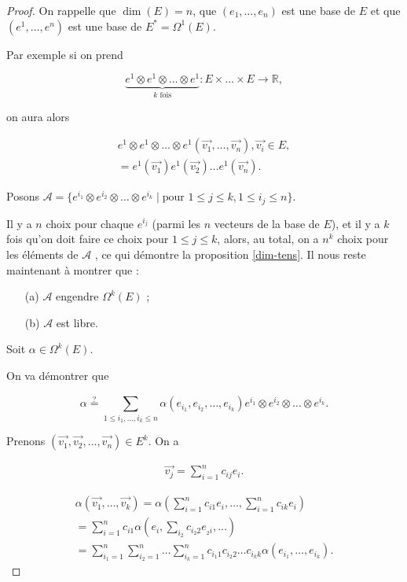 \documentclass[french]{article}
\theoremstyle{definition}
\begin{document}
\begin{proof}
  On rappelle que $\operatorname{dim}(E) = n$, que $(e_1, \dots, e_n)$ est une base de $E$ et que $(e ^{1}, \dots, e ^{n})$ est une base de $E ^{*} = \Omega ^{1}(E)$.

  Par exemple si on prend

  \[
  \underbrace{e^{1} \otimes e ^{1} \otimes \dots \otimes e ^{1}}_{k \text{ fois} } : E \times \dots \times E \to \mathbb{R},
  \]

  on aura alors

  \begin{gather*}
    e^{1} \otimes e ^{1} \otimes \dots \otimes e ^{1}(\vec{ v_1 }, \dots, \vec{ v_n }  ), \vec{ v_i } \in E, \\
    = e ^{1}(\vec{ v_1 } ) e ^{1}(\vec{ v_2 } ) \dots e ^{1}(\vec{ v_n }).
  \end{gather*}

  Posons $\mathscr{A} = \{ e ^{i_1} \otimes e ^{i_2} \otimes \dots \otimes e ^{i_k} \mid \text{pour } 1 \leq j \leq k, 1 \leq i_j \leq n  \} $.

  Il y a $n$ choix pour chaque $e ^{i_j}$ (parmi les \(n\) vecteurs de la base de \(E\)), et il y a \(k\) fois qu'on doit faire ce choix pour $1\le j\le k$, alors, au total, on a $n^k$ choix pour les éléments de $\mathscr{A}$  , ce qui démontre la proposition \ref{dim-tens}. Il nous reste maintenant à montrer que :

  \begin{enumerate}
    \item[(a)] $\mathscr{A} $ engendre $\Omega ^{k}(E)$ ;
    \item[(b)] $\mathscr{A} $ est libre.
  \end{enumerate}

  Soit $\alpha \in \Omega ^{k}(E)$.

  On va démontrer que

  \[
  \alpha \stackrel{?}{=} \sum_{1 \leq i_1, \dots, i_k \leq n}^{} \alpha(e _{i_1}, e _{i_2}, \dots, e _{i_k}) e ^{i_1} \otimes e ^{i_2} \otimes \dots \otimes e ^{i_k}.
  \]

  Prenons $(\vec{ v_1 }, \vec{ v_2 }, \dots, \vec{ v_n }) \in E ^{k}$. On a

  \begin{gather*}
    \vec{ v_j } = \sum_{i=1}^{n} c _{ij} e_i.
  \end{gather*}

  \begin{gather*}
    \alpha(\vec{ v_1 }, \dots, \vec{ v_k }) = \alpha\left(\sum_{i=1}^{n}c _{i1}e_i, \dots, \sum_{i=1}^{n} c _{ik} e_i\right) \\
    = \sum_{i=1}^{n} c _{i1} \alpha\left(e_i, \sum_{i_2}^{} c _{i_2 2} e _{_2 i}, \dots  \right)  \\
    = \sum_{i_1 =1}^{n} \sum_{i_2=1}^{n} \dots \sum_{i_k=1}^{n} c _{i_1 1} c _{i_2 2} \dots c _{i_k k} \alpha(e _{i_1},\dots, e _{i_k}).
  \end{gather*}


\end{proof}
\end{document}
